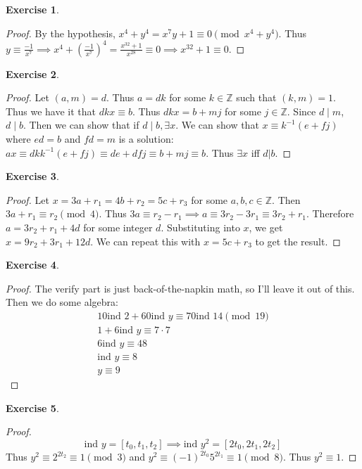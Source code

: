 \documentclass[11pt]{article}
\theoremstyle{definition}
\newtheorem{exercise}{{Exercise}}
\newcommand{\ind}{\text{ind }}
\begin{document}
\begin{exercise}
	\begin{proof}
		By the hypothesis, \(x^4 + y^4 = x^7y + 1 \equiv 0 \pmod{x^4+y^4}\). Thus \(y \equiv \frac{-1}{x^7}\implies x^4 + (\frac{-1}{x^7})^4 = \frac{x^{32} + 1}{x^{28}} \equiv 0 \implies x^{32} + 1 \equiv 0\).
	\end{proof}
\end{exercise}

\begin{exercise}
	\begin{proof}
		Let \((a,m)=d \). Thus \(a=dk \) for some \(k\in\mathbb{Z} \) such that \((k,m) = 1 \). Thus we have it that \(dkx \equiv b \). Thus \(dkx = b + mj \) for some \(j\in\mathbb{Z} \). Since \(d\mid m \), \(d\mid b \). Then we can show that if \(d\mid b, \exists x \). We can show that \(x\equiv k^{-1}(e+fj) \) where \(ed=b \) and \(fd=m \) is a solution: \(ax \equiv dkk^{-1}(e+fj) \equiv de+dfj \equiv b + mj \equiv b \). Thus \(\exists x \) iff \(d|b \).
	\end{proof}
\end{exercise}

\begin{exercise}
	\begin{proof}
		Let \(x = 3a + r_1 = 4b + r_2 = 5c + r_3\) for some \(a,b,c\in\mathbb{Z} \). Then \(3a + r_1 \equiv r_2 \pmod{4} \). Thus \(3a \equiv r_2 - r_1 \implies a \equiv 3r_2 - 3r_1 \equiv 3r_2 + r_1 \). Therefore \(a = 3r_2 + r_1 + 4d \) for some integer \(d \). Substituting into \(x \), we get \(x = 9r_2 + 3r_1 + 12d \). We can repeat this with \(x =  5c + r_3\) to get the result.
	\end{proof}
\end{exercise}

\begin{exercise}
	\begin{proof}
	The verify part is just back-of-the-napkin math, so I'll leave it out of this. Then we do some algebra:
	\begin{align*}
		10\ind 2 + 60\ind y \equiv 70\ind 14 \pmod{19}\\
		1 + 6\ind y \equiv 7 \cdot 7\\
		6\ind y \equiv 48\\
		\ind y \equiv 8\\
		y \equiv 9
	\end{align*}
	\end{proof}
\end{exercise}

\begin{exercise}
	\begin{proof}
		\[
			\ind y = [t_0, t_1, t_2] \implies \ind y^2 = [2t_0, 2t_1, 2t_2]
		\]
		Thus \(y^2 \equiv 2^{2t_2} \equiv 1 \pmod{3} \) and \(y^2 \equiv (-1)^{2t_0}5^{2t_1}  \equiv 1 \pmod{8}\). Thus \(y^2 \equiv 1 \).
	\end{proof}
\end{exercise}
\end{document}
